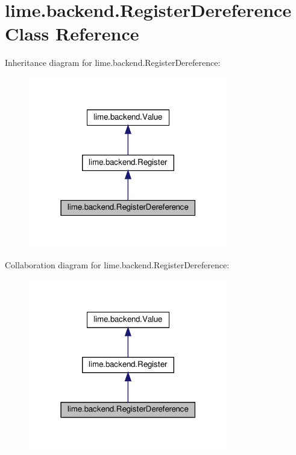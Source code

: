 \hypertarget{classlime_1_1backend_1_1RegisterDereference}{}\section{lime.\+backend.\+Register\+Dereference Class Reference}
\label{classlime_1_1backend_1_1RegisterDereference}


Inheritance diagram for lime.\+backend.\+Register\+Dereference\+:
\nopagebreak
\begin{figure}[H]
\begin{center}
\leavevmode
\includegraphics[width=247pt]{classlime_1_1backend_1_1RegisterDereference__inherit__graph}
\end{center}
\end{figure}


Collaboration diagram for lime.\+backend.\+Register\+Dereference\+:
\nopagebreak
\begin{figure}[H]
\begin{center}
\leavevmode
\includegraphics[width=247pt]{classlime_1_1backend_1_1RegisterDereference__coll__graph}
\end{center}
\end{figure}
